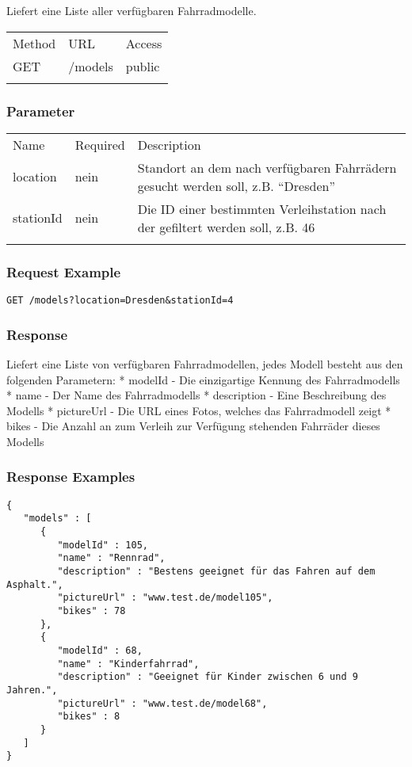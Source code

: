 Liefert eine Liste aller verfügbaren Fahrradmodelle.

\begin{longtable}[c]{@{}lll@{}}
\toprule\addlinespace
Method & URL & Access
\\\addlinespace
\midrule\endhead
GET & /models & public
\\\addlinespace
\bottomrule
\end{longtable}

\subsubsection{Parameter}\label{parameter}

\begin{longtable}[c]{@{}lll@{}}
\toprule\addlinespace
Name & Required & Description
\\\addlinespace
\midrule\endhead
location & nein & Standort an dem nach verfügbaren Fahrrädern gesucht werden soll, z.B. ``Dresden''
\\\addlinespace
stationId & nein & Die ID einer bestimmten Verleihstation nach der gefiltert werden soll, z.B. 46
\\\addlinespace
\bottomrule
\end{longtable}

\subsubsection{Request Example}\label{request-example}

\begin{verbatim}
GET /models?location=Dresden&stationId=4
\end{verbatim}

\subsubsection{Response}\label{response}

Liefert eine Liste von verfügbaren Fahrradmodellen, jedes Modell besteht
aus den folgenden Parametern: * modelId - Die einzigartige Kennung des
Fahrradmodells * name - Der Name des Fahrradmodells * description - Eine
Beschreibung des Modells * pictureUrl - Die URL eines Fotos, welches das
Fahrradmodell zeigt * bikes - Die Anzahl an zum Verleih zur Verfügung
stehenden Fahrräder dieses Modells

\subsubsection{Response Examples}\label{response-examples}

\begin{verbatim}
{
   "models" : [
      {
         "modelId" : 105,
         "name" : "Rennrad",
         "description" : "Bestens geeignet für das Fahren auf dem Asphalt.",
         "pictureUrl" : "www.test.de/model105",
         "bikes" : 78
      },
      {
         "modelId" : 68,
         "name" : "Kinderfahrrad",
         "description" : "Geeignet für Kinder zwischen 6 und 9 Jahren.",
         "pictureUrl" : "www.test.de/model68",
         "bikes" : 8
      }
   ]
}
\end{verbatim}
